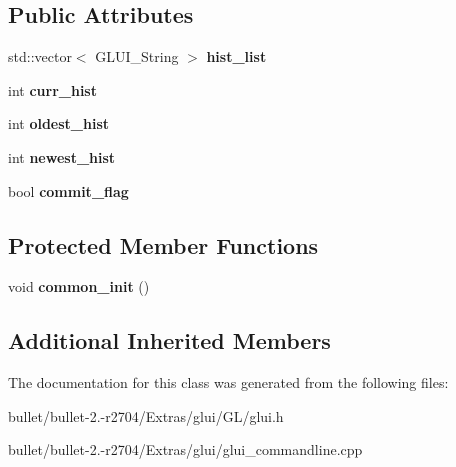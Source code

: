 \subsection*{Public Attributes}
\begin{DoxyCompactItemize}
\item 
\hypertarget{class_g_l_u_i___command_line_abc9dcdc275bb36dee1a9db8d348338b5}{std\+::vector$<$ G\+L\+U\+I\+\_\+\+String $>$ {\bfseries hist\+\_\+list}}\label{class_g_l_u_i___command_line_abc9dcdc275bb36dee1a9db8d348338b5}

\item 
\hypertarget{class_g_l_u_i___command_line_ab8d88779584003b82000b824ac6f4906}{int {\bfseries curr\+\_\+hist}}\label{class_g_l_u_i___command_line_ab8d88779584003b82000b824ac6f4906}

\item 
\hypertarget{class_g_l_u_i___command_line_a689ee6f9ede7c0f6c2060fd5650b1d22}{int {\bfseries oldest\+\_\+hist}}\label{class_g_l_u_i___command_line_a689ee6f9ede7c0f6c2060fd5650b1d22}

\item 
\hypertarget{class_g_l_u_i___command_line_af4f50f57b5a239d8564619ec0779518d}{int {\bfseries newest\+\_\+hist}}\label{class_g_l_u_i___command_line_af4f50f57b5a239d8564619ec0779518d}

\item 
\hypertarget{class_g_l_u_i___command_line_ac2f61fd248c6adb663c6de52e9e431fd}{bool {\bfseries commit\+\_\+flag}}\label{class_g_l_u_i___command_line_ac2f61fd248c6adb663c6de52e9e431fd}

\end{DoxyCompactItemize}
\subsection*{Protected Member Functions}
\begin{DoxyCompactItemize}
\item 
\hypertarget{class_g_l_u_i___command_line_a21eeafb7d6f3df4d3ddee365422894b6}{void {\bfseries common\+\_\+init} ()}\label{class_g_l_u_i___command_line_a21eeafb7d6f3df4d3ddee365422894b6}

\end{DoxyCompactItemize}
\subsection*{Additional Inherited Members}


The documentation for this class was generated from the following files\+:\begin{DoxyCompactItemize}
\item 
bullet/bullet-\/2.-\/r2704/\+Extras/glui/\+G\+L/glui.\+h\item 
bullet/bullet-\/2.-\/r2704/\+Extras/glui/glui\+\_\+commandline.\+cpp\end{DoxyCompactItemize}
